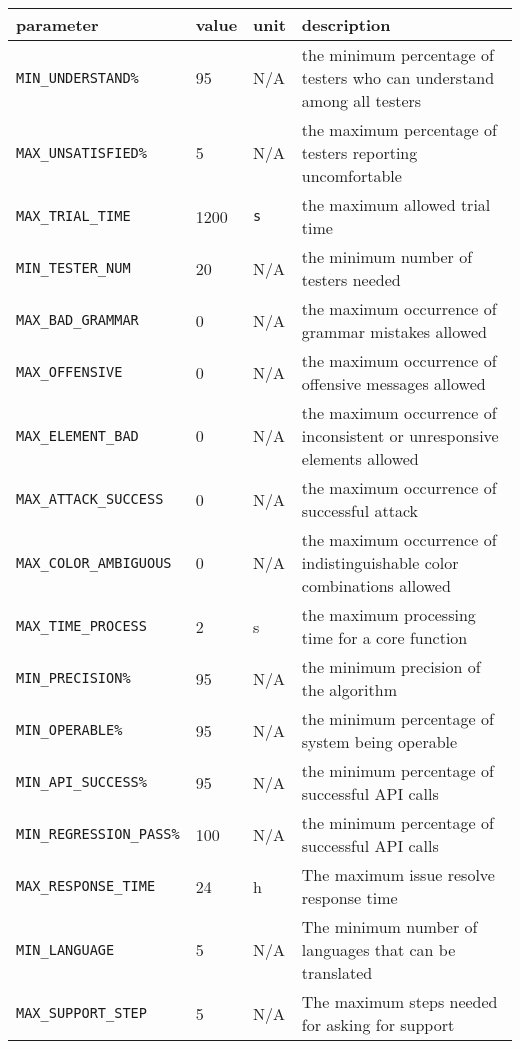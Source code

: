 \documentclass[12pt, titlepage]{article}
\begin{document}
\begin{longtable}{|l|l|l|p{5cm}|}

\hline
parameter & value & unit & description\\
\hline
\texttt{MIN\_UNDERSTAND\%}\label{MIN_UNDERSTAND} & 95 & N/A & the minimum percentage of testers who can understand among all testers\\
\hline
\texttt{MAX\_UNSATISFIED\%}\label{MAX_UNSATISFIED} & 5 & N/A & the maximum percentage of testers reporting uncomfortable\\
\hline
\texttt{MAX\_TRIAL\_TIME}\label{MAX_TRIAL_TIME} & 1200 & \texttt{s} & the maximum allowed trial time\\
\hline
\texttt{MIN\_TESTER\_NUM}\label{MIN_TESTER_NUM} &  20& N/A & the minimum number of testers needed\\
\hline
\texttt{MAX\_BAD\_GRAMMAR}\label{MAX_BAD_GRAMMAR} & 0& N/A & the maximum occurrence of grammar mistakes allowed \\
\hline
\texttt{MAX\_OFFENSIVE}\label{MAX_OFFENSIVE} & 0& N/A & the maximum occurrence of offensive messages allowed\\
\hline
\texttt{MAX\_ELEMENT\_BAD}\label{MAX_ELEMENT_BAD} & 0& N/A & the maximum occurrence of inconsistent 
 or unresponsive elements allowed\\
\hline
\texttt{MAX\_ATTACK\_SUCCESS}\label{MAX_ATTACK_SUCCESS} & 0& N/A & the maximum occurrence of successful attack\\
\hline
\texttt{MAX\_COLOR\_AMBIGUOUS}\label{MAX_COLOR_AMBIGUOUS} & 0& N/A & the maximum occurrence of indistinguishable color combinations allowed\\
\hline
\texttt{MAX\_TIME\_PROCESS}\label{MAX_TIME_PROCESS} & 2& s & the maximum processing time for a core function\\
\hline
\texttt{MIN\_PRECISION\%}\label{MIN_PRECISION} & 95 & N/A & the minimum precision of the algorithm\\
\hline
\texttt{MIN\_OPERABLE\%}\label{MIN_OPERABLE} & 95 & N/A & the minimum percentage of system being operable \\
\hline
\texttt{MIN\_API\_SUCCESS\%}\label{MIN_API_SUCCESS} & 95 & N/A &  the minimum percentage of successful API calls\\
\hline
\texttt{MIN\_REGRESSION\_PASS\%}\label{MIN_REGRESSION_PASS} & 100  & N/A &  the minimum percentage of successful API calls\\
\hline
\texttt{MAX\_RESPONSE\_TIME}\label{MAX_RESPONSE_TIME} & 24 & h & The maximum issue resolve response time\\
\hline
\texttt{MIN\_LANGUAGE}\label{MIN_LANGUAGE} & 5& N/A & The minimum number of languages that can be translated\\
\hline
\texttt{MAX\_SUPPORT\_STEP}\label{MAX_SUPPORT_STEP} & 5&N/A& The maximum steps needed for asking for support\\

\hline
\end{longtable}
\end{document}
